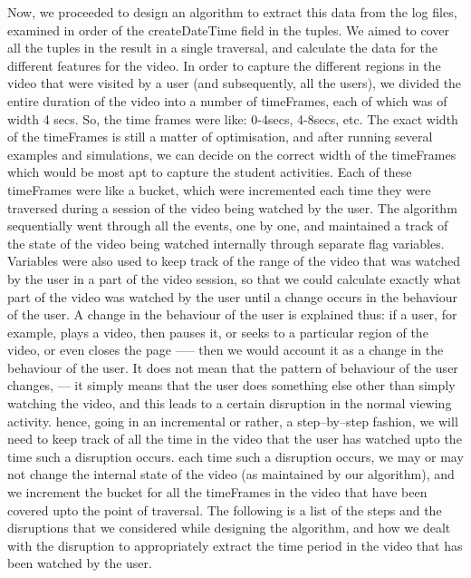 \documentclass[16pt]{report}
\begin{document}
Now, we proceeded to design an algorithm to extract this data from the log files, examined in order of the createDateTime field in the tuples. We aimed to cover all the tuples in the result in a single traversal, and calculate the data for the different features for the video. In order to capture the different regions in the video that were visited by a user (and subsequently, all the users), we divided the entire duration of the video into a number of timeFrames, each of which was of width 4 secs. So, the time frames were like: 0-4secs, 4-8secs, etc. The exact width of the timeFrames is still a matter of optimisation, and after running several examples and simulations, we can decide on the correct width of the timeFrames which would be most apt to capture the student activities. Each of these timeFrames were like a bucket, which were incremented each time they were traversed during a session of the video being watched by the user. The algorithm sequentially went through all the events, one by one, and maintained a track of the state of the video being watched internally through separate flag variables. Variables were also used to keep track of the range of the video that was watched by the user in a part of the video session, so that we could calculate exactly what part of the video was watched by the user until a change occurs in the behaviour of the user. A change in the behaviour of the user is explained thus: if a user, for example, plays a video, then pauses it, or seeks to a particular region of the video, or even closes the page ----- then we would account it as a change in the behaviour of the user. It does not mean that the pattern of behaviour of the user changes, --- it simply means that the user does something else other than simply watching the video, and this leads to a certain disruption in the normal viewing activity. hence, going in an incremental or rather, a step--by--step fashion, we will need to keep track of all the time in the video that the user has watched upto the time such a disruption occurs. each time such a disruption occurs, we may or may not change the internal state of the video (as maintained by our algorithm), and we increment the bucket for all the timeFrames in the video that have been covered upto the point of traversal. The following is a list of the steps and the disruptions that we considered while designing the algorithm, and how we dealt with the disruption to appropriately extract the time period in the video that has been watched by the user.
\end{document}

